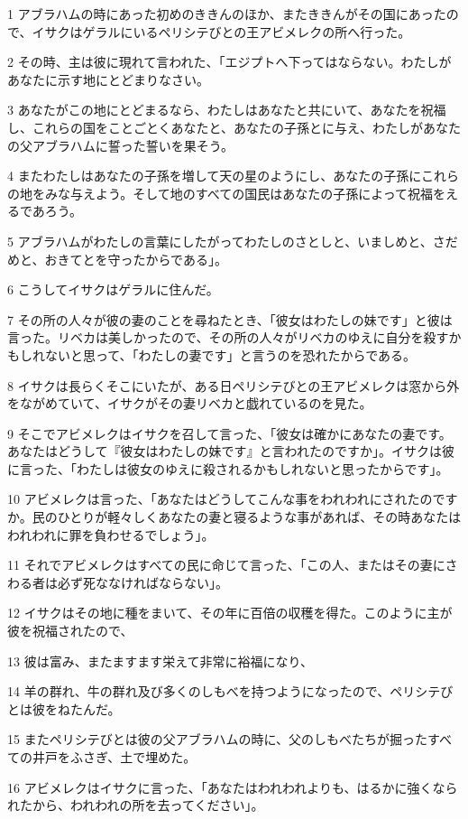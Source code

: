 \par 1 アブラハムの時にあった初めのききんのほか、またききんがその国にあったので、イサクはゲラルにいるペリシテびとの王アビメレクの所へ行った。
\par 2 その時、主は彼に現れて言われた、「エジプトへ下ってはならない。わたしがあなたに示す地にとどまりなさい。
\par 3 あなたがこの地にとどまるなら、わたしはあなたと共にいて、あなたを祝福し、これらの国をことごとくあなたと、あなたの子孫とに与え、わたしがあなたの父アブラハムに誓った誓いを果そう。
\par 4 またわたしはあなたの子孫を増して天の星のようにし、あなたの子孫にこれらの地をみな与えよう。そして地のすべての国民はあなたの子孫によって祝福をえるであろう。
\par 5 アブラハムがわたしの言葉にしたがってわたしのさとしと、いましめと、さだめと、おきてとを守ったからである」。
\par 6 こうしてイサクはゲラルに住んだ。
\par 7 その所の人々が彼の妻のことを尋ねたとき、「彼女はわたしの妹です」と彼は言った。リベカは美しかったので、その所の人々がリベカのゆえに自分を殺すかもしれないと思って、「わたしの妻です」と言うのを恐れたからである。
\par 8 イサクは長らくそこにいたが、ある日ペリシテびとの王アビメレクは窓から外をながめていて、イサクがその妻リベカと戯れているのを見た。
\par 9 そこでアビメレクはイサクを召して言った、「彼女は確かにあなたの妻です。あなたはどうして『彼女はわたしの妹です』と言われたのですか」。イサクは彼に言った、「わたしは彼女のゆえに殺されるかもしれないと思ったからです」。
\par 10 アビメレクは言った、「あなたはどうしてこんな事をわれわれにされたのですか。民のひとりが軽々しくあなたの妻と寝るような事があれば、その時あなたはわれわれに罪を負わせるでしょう」。
\par 11 それでアビメレクはすべての民に命じて言った、「この人、またはその妻にさわる者は必ず死ななければならない」。
\par 12 イサクはその地に種をまいて、その年に百倍の収穫を得た。このように主が彼を祝福されたので、
\par 13 彼は富み、またますます栄えて非常に裕福になり、
\par 14 羊の群れ、牛の群れ及び多くのしもべを持つようになったので、ペリシテびとは彼をねたんだ。
\par 15 またペリシテびとは彼の父アブラハムの時に、父のしもべたちが掘ったすべての井戸をふさぎ、土で埋めた。
\par 16 アビメレクはイサクに言った、「あなたはわれわれよりも、はるかに強くなられたから、われわれの所を去ってください」。
